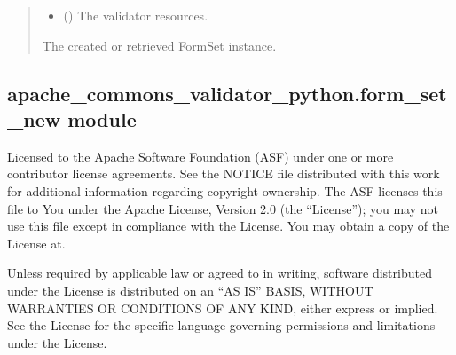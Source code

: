 \documentclass[letterpaper,10pt,english]{sphinxmanual}
\begin{document}
\begin{fulllineitems}
\begin{fulllineitems}
\begin{quote}
\begin{description}
\begin{itemize}
\item {} 
\sphinxAtStartPar
{} ({\hyperref[\detokenize{apache_commons_validator_python:apache_commons_validator_python.validator_resources_new.ValidatorResources}]{}}) \textendash{} The validator resources.

\end{itemize}

\sphinxAtStartPar
The created or retrieved FormSet instance.

\sphinxAtStartPar
{\hyperref[\detokenize{apache_commons_validator_python:apache_commons_validator_python.form_set_new.FormSet}]{}}

\end{description}\end{quote}

\end{fulllineitems}


\end{fulllineitems}



\subsection{apache\_commons\_validator\_python.form\_set\_new module}
\label{\detokenize{apache_commons_validator_python:module-apache_commons_validator_python.form_set_new}}\label{\detokenize{apache_commons_validator_python:apache-commons-validator-python-form-set-new-module}}
\sphinxAtStartPar
Licensed to the Apache Software Foundation (ASF) under one or more contributor
license agreements.  See the NOTICE file distributed with this work for additional
information regarding copyright ownership. The ASF licenses this file to You under the
Apache License, Version 2.0 (the “License”); you may not use this file except in
compliance with the License.  You may obtain a copy of the License at.

\sphinxAtStartPar
{}

\sphinxAtStartPar
Unless required by applicable law or agreed to in writing, software
distributed under the License is distributed on an “AS IS” BASIS,
WITHOUT WARRANTIES OR CONDITIONS OF ANY KIND, either express or implied.
See the License for the specific language governing permissions and
limitations under the License.
\end{document}
